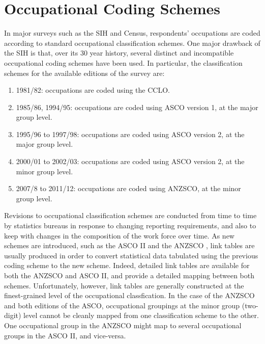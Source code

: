 \section{Occupational Coding Schemes}
\label{sec:occcoding}

In major surveys such as the SIH and Census, respondents' occupations are coded according to standard occupational classification schemes. One major drawback of the SIH is that, over its 30 year history, several distinct and incompatible occupational coding schemes have been used. In particular, the classification schemes for the available editions of the survey are:
\begin{enumerate}
\item 1981/82: occupations are coded using the CCLO.
\item 1985/86, 1994/95: occupations are coded using ASCO version 1, at the major group level.
\item 1995/96 to 1997/98: occupations are coded using ASCO version 2, at the major group level.
\item 2000/01 to 2002/03: occupations are coded using ASCO version 2, at the minor group level.
\item 2007/8 to 2011/12: occupations are coded using ANZSCO, at the minor group level.
\end{enumerate}
Revisions to occupational classification schemes are conducted from time to time by statistics bureaus in response to changing reporting requirements, and also to keep with changes in the composition of the work force over time. As new schemes are introduced, such as the ASCO II \citep{Castles1986} and the ANZSCO \citep{Trewin2006}, link tables are usually produced in order to convert statistical data tabulated using the previous coding scheme to the new scheme. Indeed, detailed link tables are available for both the ANZSCO and ASCO II, and provide a detailed mapping between both schemes. Unfortunately, however, link tables are generally constructed at the finest-grained level of the occupational classfication. In the case of the ANZSCO and both editions of the ASCO, occupational groupings at the minor group (two-digit) level cannot be cleanly mapped from one classification scheme to the other. One occupational group in the ANZSCO might map to several occupational groups in the ASCO II, and vice-versa.

